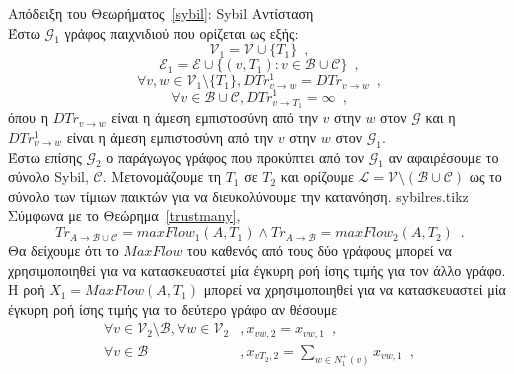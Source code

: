\begin{sepproof}{Απόδειξη του Θεωρήματος~\ref{sybil}: \textlatin{Sybil} Αντίσταση} \ \\
\label{sybilproof}
  Έστω $\mathcal{G}_1$ γράφος παιχνιδιού που ορίζεται ως εξής:
  \begin{equation*}
    \mathcal{V}_1 = \mathcal{V} \cup \{T_1\} \enspace,
  \end{equation*}
  \begin{equation*}
    \mathcal{E}_1 = \mathcal{E} \cup \{(v, T_1) : v \in \mathcal{B} \cup \mathcal{C}\} \enspace,
  \end{equation*}
  \begin{equation*}
    \forall v,w \in \mathcal{V}_1 \setminus \{T_1\}, DTr^1_{v \rightarrow w} = DTr_{v \rightarrow w} \enspace,
  \end{equation*}
  \begin{equation*}
    \forall v \in \mathcal{B} \cup \mathcal{C}, DTr^1_{v \rightarrow T_1} = \infty \enspace,
  \end{equation*}
  όπου η $DTr_{v \rightarrow w}$ είναι η άμεση εμπιστοσύνη από την $v$ στην $w$ στον $\mathcal{G}$ και η $DTr^1_{v \rightarrow
  w}$ είναι η άμεση εμπιστοσύνη από την $v$ στην $w$ στον $\mathcal{G}_1$. \\
  Έστω επίσης $\mathcal{G}_2$ ο παράγωγος γράφος που προκύπτει από τον $\mathcal{G}_1$ αν αφαιρέσουμε το σύνολο
  \textlatin{Sybil}, $\mathcal{C}$. Μετονομάζουμε τη $T_1$ σε $T_2$ και ορίζουμε $\mathcal{L} = \mathcal{V} \setminus
  \left(\mathcal{B} \cup \mathcal{C}\right)$ ως το σύνολο των τίμιων παικτών για να διευκολύνουμε την κατανόηση.
  {sybilres.tikz}
  Σύμφωνα με το Θεώρημα~\ref{trustmany},
  \begin{equation}
  \label{trmaxflow}
    Tr_{A \rightarrow \mathcal{B} \cup \mathcal{C}} = maxFlow_1\left(A, T_1\right) \wedge
    Tr_{A \rightarrow \mathcal{B}} = maxFlow_2\left(A, T_2\right) \enspace.
  \end{equation}
  Θα δείχουμε ότι το $MaxFlow$ του καθενός από τους δύο γράφους μπορεί να χρησιμοποιηθεί για να κατασκευαστεί μία έγκυρη ροή
  ίσης τιμής για τον άλλο γράφο. Η ροή $X_1 = MaxFlow\left(A, T_1\right)$ μπορεί να χρησιμοποιηθεί για να κατασκευαστεί μία
  έγκυρη ροή ίσης τιμής για το δεύτερο γράφο αν θέσουμε
  \begin{align*}
    \forall v \in \mathcal{V}_2 \setminus \mathcal{B}, \forall w \in \mathcal{V}_2&, x_{vw,2} = x_{vw,1} \enspace, \\
    \forall v \in \mathcal{B}&, x_{vT_2,2} = \sum\limits_{w \in N^{+}_1\left(v\right)}x_{vw,1} \enspace, \\

\end{align*}
\end{sepproof}
